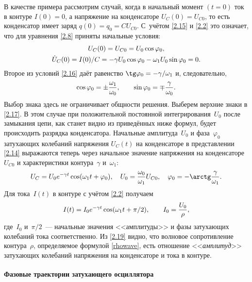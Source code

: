 В качестве примера рассмотрим случай, когда в начальный момент $(t=0)$ ток в
контуре $I(0)=0$, а напряжение на конденсаторе $U_C(0)=U_{C0}$, то есть
конденсатор имеет заряд $q(0)=q_0=CU_{C0}$. С~учётом \eqref{2.15} и \eqref{2.2}
это означает, что для уравнения \eqref{2.8} приняты начальные условия:
\begin{equation}
	\eqmark{2.16}
		\begin{gathered}[c]
			U_C(0)=U_{C0}=U_0 \cos\varphi_0, \\
			\dot{U}_C(0)=I(0)/C=-\gamma
U_0 \cos\varphi_0-\omega_1U_0 \sin\varphi_0=0.
		\end{gathered}
\end{equation}
Второе из условий \eqref{2.16} даёт равенство $\tg\varphi_0=-\gamma/\omega_1$
и, следовательно,
\begin{equation}\eqmark{2.17}
\cos\varphi_0=\pm\frac{\omega_1}{\omega_0}, \qquad 
\sin\varphi_0=\mp\frac{\gamma}{\omega_0}.
\end{equation}
Выбор знака здесь не ограничивает общности решения. Выберем верхние знаки в
\eqref{2.17}. В этом случае при положительной постоянной интегрирования~$U_0$
после замыкания цепи, как станет видно из приведённых ниже формул, будет
происходить разрядка конденсатора. Начальные амплитуда~$U_0$ и фаза~$\varphi_0$
затухающих колебаний напряжения $U_C(t)$ на конденсаторе в представлении
\eqref{2.14} выражаются теперь через начальное значение напряжения на
конденсаторе $U_{C0}$ и характеристики контура~$\gamma$ и~$\omega_1$:
\begin{equation}\eqmark{2.18}
U_C=U_{0} e^{-\gamma t}\cos(\omega_1t+\varphi_0), \quad
U_0 =\frac{\omega_0}{\omega_1}U_{C0}, \quad 
\varphi_0=-\arctg \frac{\gamma}{\omega_1}.
\end{equation}
Для тока~$I(t)$ в контуре с учётом \eqref{2.2} получаем 
\begin{equation}\eqmark{2.19}
I(t)=I_0 e^{-\gamma t}\cos(\omega_1t+\pi/2), \qquad I_0=\frac{U_0}{\rho},
\end{equation}
где~$I_0$ и~$\pi/2$~--- начальные значения <<амплитуды>> и фазы
затухающих колебаний тока соответственно.
Из \eqref{2.19} видно, что волновое сопротивление контура~$\rho$, 
определяемое формулой \eqref{rhowave},
есть отношение <<\emph{амплитуд}>> затухающих колебаний напряжения на конденсаторе и тока
 в контуре.

\paragraph{Фазовые траектории затухающего осциллятора}

